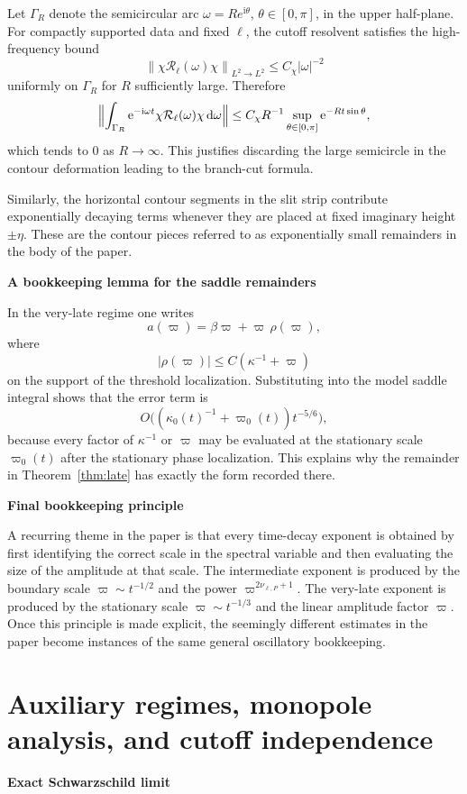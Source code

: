 \documentclass[12pt]{article}
\numberwithin{equation}{section}
\theoremstyle{plain}
\theoremstyle{definition}
\theoremstyle{remark}
\newcommand{\ii}{\mathrm i}
\newcommand{\ee}{\mathrm e}
\newcommand{\dd}{\mathrm d}
\newcommand{\cR}{\mathcal R}
\newcommand{\om}{\omega}
\newcommand{\vp}{\varpi}
\newcommand{\kap}{\kappa}
\newcommand{\abs}[1]{\left|#1\right|}
\newcommand{\norm}[1]{\left\|#1\right\|}
\newcommand{\appheading}[1]{\par\medskip\noindent\textbf{#1}\par\smallskip\noindent}
\begin{document}
Let $\Gamma_R$ denote the semicircular arc $\om=Re^{\ii\theta}$, $\theta\in[0,\pi]$, in the upper half-plane.  For compactly supported data and fixed $\ell$, the cutoff resolvent satisfies the high-frequency bound
\[
   \norm{\chi\cR_\ell(\om)\chi}_{L^2\to L^2}\le C_\chi\abs{\om}^{-2}
\]
uniformly on $\Gamma_R$ for $R$ sufficiently large.  Therefore
\[
   \Bigl\|\int_{\Gamma_R}\ee^{-\ii\om t}\chi\cR_\ell(\om)\chi\,\dd\om\Bigr\|
   \le
   C_\chi R^{-1}\sup_{\theta\in[0,\pi]}\ee^{-Rt\sin\theta},
\]
which tends to $0$ as $R\to\infty$.  This justifies discarding the large semicircle in the contour deformation leading to the branch-cut formula.

Similarly, the horizontal contour segments in the slit strip contribute exponentially decaying terms whenever they are placed at fixed imaginary height $\pm\eta$.  These are the contour pieces referred to as exponentially small remainders in the body of the paper.

\appheading{A bookkeeping lemma for the saddle remainders}

In the very-late regime one writes
\[
   a(\vp)=\beta\vp+\vp\,\rho(\vp),
\]
where
\[
   \abs{\rho(\vp)}\le C(\kap^{-1}+\vp)
\]
on the support of the threshold localization.  Substituting into the model saddle integral shows that the error term is
\[
   O\!\bigl((\kap_0(t)^{-1}+\vp_0(t))t^{-5/6}\bigr),
\]
because every factor of $\kap^{-1}$ or $\vp$ may be evaluated at the stationary scale $\vp_0(t)$ after the stationary phase localization.  This explains why the remainder in Theorem~\ref{thm:late} has exactly the form recorded there.

\appheading{Final bookkeeping principle}

A recurring theme in the paper is that every time-decay exponent is obtained by first identifying the correct scale in the spectral variable and then evaluating the size of the amplitude at that scale.  The intermediate exponent is produced by the boundary scale $\vp\sim t^{-1/2}$ and the power $\vp^{2\nu_{\ell,P}+1}$.  The very-late exponent is produced by the stationary scale $\vp\sim t^{-1/3}$ and the linear amplitude factor $\vp$.  Once this principle is made explicit, the seemingly different estimates in the paper become instances of the same general oscillatory bookkeeping.

\section{Auxiliary regimes, monopole analysis, and cutoff independence}\label{app:small_mass}
\appheading{Exact Schwarzschild limit}
\end{document}
